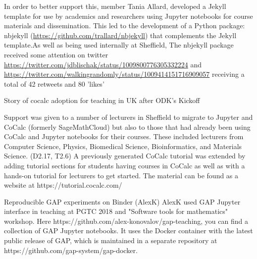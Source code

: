 \begin{Aim 1}
In order to better support this, \ODK member Tania Allard, developed a Jekyll template for use by academics and researchers using Jupyter notebooks for course materials and dissemination. This led to the development of a Python package: nbjekyll (\url{https://github.com/trallard/nbjekyll}) that complements the Jekyll template.As well as being used internally at Sheffield, The nbjekyll package received some attention on twitter \url{https://twitter.com/jdblischak/status/1009800776305332224} and \url{https://twitter.com/walkingrandomly/status/1009414151716909057} receiving a total of 42 retweets and 80 'likes'%


Story of cocalc adoption for teaching in UK after ODK's Kickoff
            
Support was given to a number of lecturers in Sheffield to migrate to Jupyter and CoCalc (formerly SageMathCloud) but also to those that had already been using CoCalc and Jupyter notebooks for their courses. These included lecturers from Computer Science, Physics, Biomedical Science, Bioinformatics, and Materials Science. (D2.17, T2.6) A previously generated CoCalc tutorial was extended by adding tutorial sections for students having courses in CoCalc as well as with a hands-on tutorial for lecturers to get started. The material can be found as a website at https://tutorial.cocalc.com/ 


               Reproducible GAP experiments on Binder (AlexK)
AlexK %
used GAP Jupyter interface in teaching at PGTC 2018 and "Software tools for mathematics" workshop.
Here https://github.com/alex-konovalov/gap-teaching, you can find a collection of GAP Jupyter notebooks. It uses the Docker container with the latest public release of GAP, which is maintained in a separate repository at https://github.com/gap-system/gap-docker.


\end{Aim 1}
